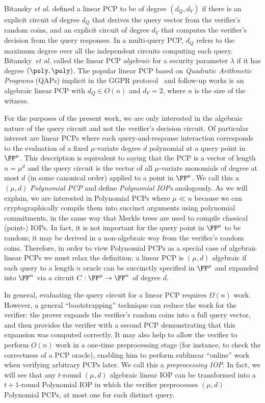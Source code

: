 Bitansky \emph{et al.} \cite{TCC:BCIOP13} defined a linear PCP to be of degree $(d_Q, d_V)$ if there is an explicit circuit of degree $d_Q$ that derives the query vector from the verifier's random coins, and an explicit circuit of degree $d_V$ that computes the verifier's decision from the query responses. %
In a multi-query PCP, $d_Q$ refers to the maximum degree over all the independent circuits computing each query. Bitansky~\emph{et al.} called the linear PCP \emph{algebraic} for a security parameter $\lambda$ if it has degree $(\poly, \poly)$. The popular linear PCP based on \emph{Quadratic Arithmetic Programs} (QAPs) implicit in the GGPR protocol~\cite{EC:GGPR13} and follow-up works is an algebraic linear PCP with $d_Q \in O(n)$ and $d_V = 2$, where $n$ is the size of the witness.

For the purposes of the present work, we are only interested in the algebraic nature of the query circuit and not the verifier's decision circuit. Of particular interest are linear PCPs where each query-and-response interaction corresponds to the evaluation of a fixed $\mu$-variate degree $d$ polynomial at a query point in $\FF^\mu$. This description is equivalent to saying that the PCP is a vector of length $n = \mu^d$ and the query circuit is the vector of all $\mu$-variate monomials of degree at most $d$ (in some canonical order) applied to a point in $\FF^\mu$. We call this a $(\mu, d)$ \emph{Polynomial PCP} and define \emph{Polynomial IOPs} analogously. As we will explain, we are interested in Polynomial PCPs where $\mu \ll n$ because we can cryptographically compile them into succinct arguments using polynomial commitments, in the same way that Merkle trees are used to compile classical (point-) IOPs. In fact, it is not important for the query point in $\FF^\mu$ to be random; it may be derived in a non-algebraic way from the verifier's random coins. Therefore, in order to view Polynomial PCPs as a special case of algebraic linear PCPs we must relax the definition: a linear PCP is $(\mu, d)$ algebraic if each query to a length $n$ oracle can be succinctly specified in $\FF^\mu$ and expanded into $\FF^n$ via a circuit $C : \FF^\mu \rightarrow \FF^n$ of degree $d$. 

In general, evaluating the query circuit for a linear PCP requires $\Omega(n)$ work. However, a general ``bootstrapping'' technique can reduce the work for the verifier: the prover expands the verifier's random coins into a full query vector, and then provides the verifier with a second PCP demonstrating that this expansion was computed correctly. It may also help to allow the verifier to perform $O(n)$ work in a one-time preprocessing stage (for instance, to check the correctness of a PCP oracle), enabling him to perform sublinear ``online'' work when verifying arbitrary PCPs later. We call this a \emph{preprocessing IOP}. In fact, we will see that any $t$-round $(\mu, d)$ algebraic linear IOP can be transformed into a $t+1$-round Polynomial IOP in which the verifier preprocesses $(\mu, d)$ Polynomial PCPs, at most one for each distinct query. 

